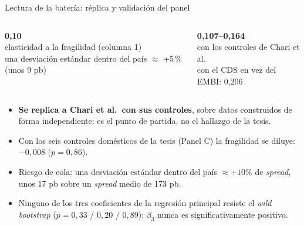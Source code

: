 \documentclass[aspectratio=169]{beamer}
\newcommand{\cifra}[2]{\begin{center}{\Huge\bfseries\color{tesisblue}#1}\\[2pt]{\small #2}\end{center}}
\begin{document}
\begin{frame}{Lectura de la batería: réplica y validación del panel}
\begin{columns}[T]
\cifra{0,10}{elasticidad a la fragilidad (columna 1)\\ una desviación estándar dentro del país $\approx$ +5\,\% (unos 9 pb)}
\cifra{0,107--0,164}{con los controles de Chari et al.\\ con el CDS en vez del EMBI: 0,206}
\end{columns}
\vspace{2pt}
\small
\begin{itemize}
\item \textbf{Se replica a Chari et al.\ con sus controles}, sobre datos construidos de forma independiente: es el punto de partida, no el hallazgo de la tesis.
\item Con los seis controles domésticos de la tesis (Panel C) la fragilidad se diluye: $-0{,}008$ ($p=0{,}86$).
\item Riesgo de cola: una desviación estándar dentro del país $\approx+10\%$ de \textit{spread}, unos 17 pb sobre un \textit{spread} medio de 173 pb.
\item Ninguno de los tres coeficientes de la regresión principal resiste el \textit{wild bootstrap} ($p=0{,}33$ / $0{,}20$ / $0{,}89$); $\beta_3$ nunca es significativamente positivo.
\end{itemize}
\end{frame}
\end{document}
